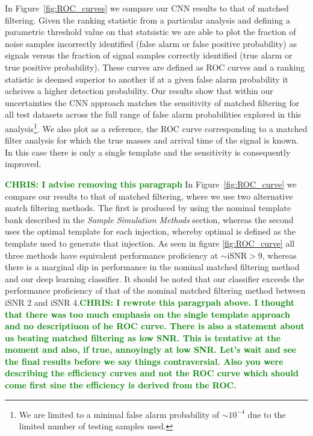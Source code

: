 \documentclass[%
showpacs,
 amsmath,amssymb,
 aps,
 twocolumn,
 prl,
 reprint,
floatfix,
]{revtex4-1}
\newcommand{\chris}[1]{\textbf{\textcolor{green}{CHRIS: #1}}}
\begin{document}
%
%
In Figure~\ref{fig:ROC_curves} we compare our \ac{CNN} results to that of
matched filtering. Given the ranking statistic from a particular analysis and
defining a parametric threshold value on that statsistic we are able to plot
the fraction of noise samples incorrectly identified (false alarm or false
positive probability) as signals versus the fraction of signal samples
correctly identified (true alarm or true positive probability). These curves
are defined as \ac{ROC} curves and a ranking statistic is deemed superior to
another if at a given false alarm probability it acheives a higher detection
probability. Our results show that within our uncertainties the \ac{CNN}
approach matches the sensitivity of matched filtering for all test datasets
across the full range of false alarm probabilities explored in this
analysis\footnote{We are limited to a minimal false alarm probability of $\sim
10^{-4}$ due to the limited number of testing samples used.}. We also plot as a
reference, the \ac{ROC} curve corresponding to a matched filter analysis for
which the true masses and arrival time of the signal is known. In this case
there is only a single template and the sensitivity is consequently improved.  

%
%
\chris{I advise removing this paragraph} In Figure~\ref{fig:ROC_curve} we
compare our results to that of matched filtering, where we use two alternative
match filtering methods.  The first is produced by using the nominal template bank described
in the \textit{Sample Simulation Methods} section, whereas the second uses the
optimal template for each injection, whereby optimal is defined as the template
used to generate that injection. As seen in figure \ref{fig:ROC_curve} all
three methods have equivalent performance proficiency at $\sim \mathrm{iSNR} >
9$, whereas there is a marginal dip in performance in the nominal matched
filtering method and our deep learning classifier. It should be noted that our
classifier exceeds the performance proficiency of that of the nominal matched
filtering method between iSNR 2 and iSNR 4.\chris{I rewrote this paragrpah
above. I thought that there was too much emphasis on the single template
approach and no descriptiuon of he ROC curve. There is also a statement about
us beating matched filtering as low SNR. This is tentative at the moment and
also, if true, annoyingly at low SNR.  Let's wait and see the final results
before we say things contraversial. Also you were describing the efficiency
curves and not the ROC curve which should come first sine the efficiency is
derived from the ROC.} 
\end{document}
